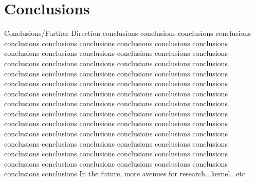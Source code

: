 \documentclass{IEEEtran}
\begin{document}
\section{Conclusions}
Conclusions/Further Direction
conclusions conclusions conclusions conclusions conclusions conclusions conclusions 
conclusions conclusions conclusions conclusions conclusions conclusions conclusions 
conclusions conclusions conclusions conclusions conclusions conclusions conclusions 
conclusions conclusions conclusions conclusions conclusions conclusions conclusions 
conclusions conclusions conclusions conclusions conclusions conclusions conclusions 
conclusions conclusions conclusions conclusions conclusions conclusions conclusions 
conclusions conclusions conclusions conclusions conclusions conclusions conclusions 
conclusions conclusions conclusions conclusions conclusions conclusions conclusions 
conclusions conclusions conclusions conclusions conclusions conclusions conclusions 
conclusions conclusions conclusions conclusions conclusions conclusions conclusions 
conclusions conclusions conclusions conclusions conclusions conclusions conclusions 
conclusions conclusions conclusions conclusions conclusions conclusions conclusions 
In the future, more avenues for research...kernel...etc




\end{document}
